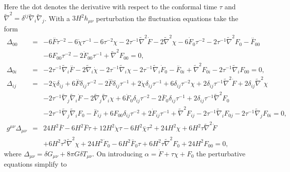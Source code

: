 \documentclass[aps,onecolumn,10pt]{revtex4}
\numberwithin{equation}{section}
\numberwithin{equation}{section}
\begin{document}
%
Here the dot denotes the derivative with respect to the conformal time $\tau$ and $\tilde{\nabla}^2=\delta^{ij}\tilde{\nabla}_i\tilde{\nabla}_j$. With a $3H^2h_{\mu\nu}$ perturbation  the fluctuation equations take the form
%
\begin{eqnarray}
\Delta_{00}&=& -6 \overset{..}{F} \tau^{-2} - 6 \dot{\chi} \tau^{-1} - 6 \tau^{-2} \chi - 2 \tau^{-1} \tilde{\nabla}^2\dot{F} - 2 \tilde{\nabla}^2\chi -6 \dot{F}_{0} \tau^{-2} - 2 \tau^{-1} \tilde{\nabla}^2F_{0}- \overset{..}{F}_{00} 
\nonumber \\ 
&& - 6 F_{00} \tau^{-2} - 2 \dot{F}_{00} \tau^{-1} + \tilde{\nabla}^2F_{00}=0,
\nonumber\\ 
\Delta_{0i}&=& -2 \tau^{-1} \tilde{\nabla}_{i}\overset{..}{F} - 2 \tilde{\nabla}_{i}\dot{\chi} - 2 \tau^{-1} \tilde{\nabla}_{i}\chi -2 \tau^{-1} \tilde{\nabla}_{i}\dot{F}_{0}- \overset{..}{F}_{0i} + \tilde{\nabla}^2F_{0i} - 2 \tau^{-1} \tilde{\nabla}_{i}F_{00}=0,
\nonumber\\ 
\Delta_{ij}&=& -2 \overset{..}{\chi}\delta_{ij} + 6 \overset{..}{F}\delta_{ij} \tau^{-2} - 2 \overset{...}{F}\delta_{ij} \tau^{-1} + 2 \dot{\chi}\delta_{ij} \tau^{-1} + 6\delta_{ij} \tau^{-2} \chi + 2\delta_{ij} \tau^{-1} \tilde{\nabla}^2\dot{F} + 2\delta_{ij} \tilde{\nabla}^2\chi 
\nonumber \\ 
&& - 2 \tau^{-1} \tilde{\nabla}_{j}\tilde{\nabla}_{i}\dot{F} - 2 \tilde{\nabla}_{j}\tilde{\nabla}_{i}\chi +6 \dot{F}_{0}\delta_{ij} \tau^{-2} - 2 \overset{..}{F}_{0}\delta_{ij} \tau^{-1} + 2\delta_{ij} \tau^{-1} \tilde{\nabla}^2F_{0} \nonumber \\ 
&& - 2 \tau^{-1} \tilde{\nabla}_{j}\tilde{\nabla}_{i}F_{0}- \overset{..}{F}_{ij} + 6 F_{00}\delta_{ij} \tau^{-2} + 2 \dot{F}_{ij} \tau^{-1} + \tilde{\nabla}^2F_{ij} -2 \tau^{-1} \tilde{\nabla}_{i}F_{0j} - 2 \tau^{-1} \tilde{\nabla}_{j}F_{0i}=0,
\nonumber\\
g^{\mu\nu}\Delta_{\mu\nu} &=& 24 H^2 \overset{..}{F} - 6 H^2 \overset{...}{F} \tau + 12 H^2 \dot{\chi} \tau - 6 H^2 \overset{..}{\chi} \tau^2 + 24 H^2 \chi + 6 H^2 \tau \tilde{\nabla}^2\dot{F} 
\nonumber \\ 
&& + 6 H^2 \tau^2 \tilde{\nabla}^2\chi +24 H^2 \dot{F}_{0} - 6 H^2 \overset{..}{F}_{0} \tau + 6 H^2 \tau \tilde{\nabla}^2F_{0}+24 H^2 F_{00}=0,
\label{6.53}
\end{eqnarray}
%
where $\Delta_{\mu\nu}=\delta G_{\mu\nu}+8\pi G \delta T_{\mu\nu}$.
On introducing $\alpha=\dot{F}+\tau\chi+F_0$ the perturbative equations simplify to 
%
\end{document}
